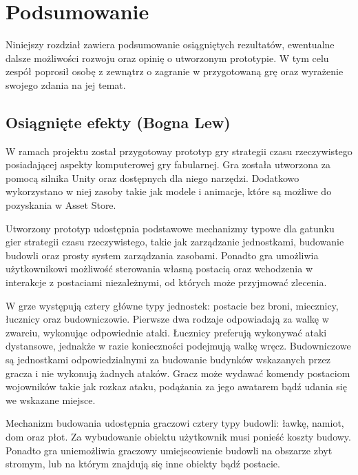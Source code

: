 \chapter{Podsumowanie}\label{chap:summary}
Niniejszy rozdział zawiera podsumowanie osiągniętych rezultatów, ewentualne dalsze możliwości rozwoju oraz opinię o
utworzonym prototypie. W tym celu zespół poprosił osobę z zewnątrz o zagranie w przygotowaną grę oraz wyrażenie swojego
zdania na jej temat.

\section{Osiągnięte efekty (Bogna Lew)}
W ramach projektu został przygotoway prototyp gry strategii czasu rzeczywistego posiadającej aspekty komputerowej gry
fabularnej. Gra została utworzona za pomocą silnika Unity oraz dostępnych dla niego narzędzi. Dodatkowo wykorzystano w
niej zasoby takie jak modele i animacje, które są możliwe do pozyskania w Asset Store.

Utworzony prototyp udostępnia podstawowe mechanizmy typowe dla gatunku gier strategii czasu rzeczywistego, takie jak
zarządzanie jednostkami, budowanie budowli oraz prosty system zarządzania zasobami. Ponadto gra umożliwia użytkownikowi
możliwość sterowania własną postacią oraz wchodzenia w interakcje z postaciami niezależnymi, od których może przyjmować
zlecenia.

W grze występują cztery główne typy jednostek: postacie bez broni, miecznicy, łucznicy oraz budowniczowie. Pierwsze dwa
rodzaje odpowiadają za walkę w zwarciu, wykonując odpowiednie ataki. Łucznicy preferują wykonywać ataki dystansowe,
jednakże w razie konieczności podejmują walkę wręcz. Budowniczowe są jednostkami odpowiedzialnymi za budowanie budynków
wskazanych przez gracza i nie wykonują żadnych ataków. Gracz może wydawać komendy postaciom wojowników takie jak rozkaz
ataku, podążania za jego awatarem bądź udania się we wskazane miejsce.

Mechanizm budowania udostępnia graczowi cztery typy budowli: ławkę, namiot, dom oraz płot. Za wybudowanie obiektu
użytkownik musi ponieść koszty budowy. Ponadto gra uniemożliwia graczowy umiejscowienie budowli na obszarze zbyt stromym,
lub na którym znajdują się inne obiekty bądź postacie.



